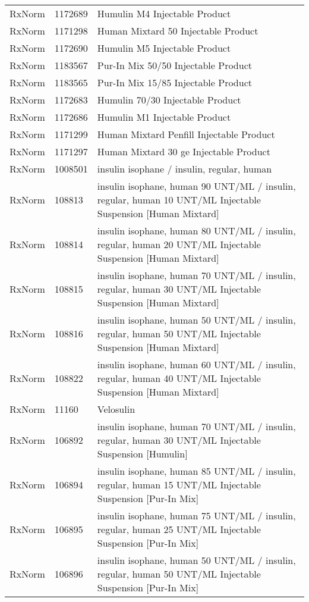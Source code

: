 \begin{longtable}{p{}p{}p{}}
  RxNorm & 1172689 & Humulin M4 Injectable Product \\ 
  RxNorm & 1171298 & Human Mixtard 50 Injectable Product \\ 
  RxNorm & 1172690 & Humulin M5 Injectable Product \\ 
  RxNorm & 1183567 & Pur-In Mix 50/50 Injectable Product \\ 
  RxNorm & 1183565 & Pur-In Mix 15/85 Injectable Product \\ 
  RxNorm & 1172683 & Humulin 70/30 Injectable Product \\ 
  RxNorm & 1172686 & Humulin M1 Injectable Product \\ 
  RxNorm & 1171299 & Human Mixtard Penfill Injectable Product \\ 
  RxNorm & 1171297 & Human Mixtard 30 ge Injectable Product \\ 
  RxNorm & 1008501 & insulin isophane / insulin, regular, human \\ 
  RxNorm & 108813 & insulin isophane, human 90 UNT/ML / insulin, regular, human 10 UNT/ML Injectable Suspension [Human Mixtard] \\ 
  RxNorm & 108814 & insulin isophane, human 80 UNT/ML / insulin, regular, human 20 UNT/ML Injectable Suspension [Human Mixtard] \\ 
  RxNorm & 108815 & insulin isophane, human 70 UNT/ML / insulin, regular, human 30 UNT/ML Injectable Suspension [Human Mixtard] \\ 
  RxNorm & 108816 & insulin isophane, human 50 UNT/ML / insulin, regular, human 50 UNT/ML Injectable Suspension [Human Mixtard] \\ 
  RxNorm & 108822 & insulin isophane, human 60 UNT/ML / insulin, regular, human 40 UNT/ML Injectable Suspension [Human Mixtard] \\ 
  RxNorm & 11160 & Velosulin \\ 
  RxNorm & 106892 & insulin isophane, human 70 UNT/ML / insulin, regular, human 30 UNT/ML Injectable Suspension [Humulin] \\ 
  RxNorm & 106894 & insulin isophane, human 85 UNT/ML / insulin, regular, human 15 UNT/ML Injectable Suspension [Pur-In Mix] \\ 
  RxNorm & 106895 & insulin isophane, human 75 UNT/ML / insulin, regular, human 25 UNT/ML Injectable Suspension [Pur-In Mix] \\ 
  RxNorm & 106896 & insulin isophane, human 50 UNT/ML / insulin, regular, human 50 UNT/ML Injectable Suspension [Pur-In Mix] \\ 

\end{longtable}

